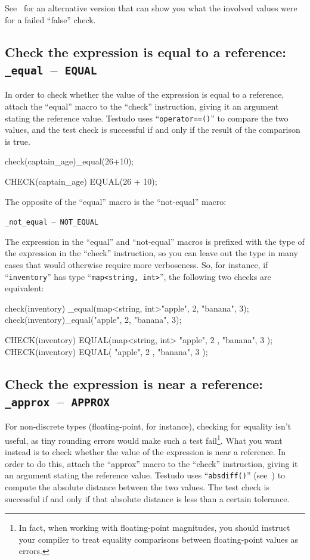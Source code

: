 \documentclass[twoside, a4paper, article]{memoir}
\newcommand*\testudocolor{\color{red!80!blue}}
\newcommand*\testudo[1]{\texttt{\testudocolor{}#1}}
\newcommand*\testudopair[2]{\testudo{#1}~--~\testudo{#2}}
\newcommand\subsectiontestudopair[3]{%
  \subsection[#1]{#1: \testudopair{#2}{#3}}}
\begin{document}
See~ for an alternative version that can
show you what the involved values were for a failed ``false'' check.

\subsectiontestudopair{Check the expression is equal to a reference}%
  {\_equal}{EQUAL}
\label{sec:check-expression-equal-reference}

In order to check whether the value of the expression is equal to a reference,
attach the ``equal'' macro to the ``check'' instruction, giving it an argument
stating the reference value.  Testudo uses ``\texttt{operator==()}'' to
compare the two values, and the test check is successful if and only if the
result of the comparison is true.

\begin{cpplisting}
check(captain_age)_equal(26+10);
\end{cpplisting}

\begin{cpplisting}
CHECK(captain_age) EQUAL(26 + 10);
\end{cpplisting}

The opposite of the ``equal'' macro is the ``not-equal'' macro:
\begin{center}
  \testudopair{\_not\_equal}{NOT\_EQUAL}
\end{center}

The expression in the ``equal'' and ``not-equal'' macros is prefixed with the
type of the expression in the ``check'' instruction, so you can leave out the
type in many cases that would otherwise require more verboseness.  So, for
instance, if ``\texttt{inventory}'' has type ``\texttt{map<string, int>}'', the
following two checks are equivalent:
\begin{cpplisting}
check(inventory)
  _equal(map<string, int>{{"apple", 2}, {"banana", 3}});
check(inventory)_equal({{"apple", 2}, {"banana", 3}});
\end{cpplisting}

\begin{cpplisting}
CHECK(inventory)
  EQUAL(map<string, int>{ { "apple", 2 }, { "banana", 3 } });
CHECK(inventory) EQUAL({ { "apple", 2 }, { "banana", 3 } });
\end{cpplisting}


\subsectiontestudopair{Check the expression is near a reference}%
  {\_approx}{APPROX}
\label{sec:check-expression-near-reference}

For non-discrete types (floating-point, for instance), checking for equality
isn't useful, as tiny rounding errors would make such a test fail\footnote{In
  fact, when working with floating-point magnitudes, you should instruct your
  compiler to treat equality comparisons between floating-point values as
  errors.}.  What you want instead is to check whether the value of the
expression is near a reference.  In order to do this, attach the ``approx''
macro to the ``check'' instruction, giving it an argument stating the reference
value.  Testudo uses ``\texttt{absdiff()}''
(see~) to compute the absolute distance
between the two values.  The test check is successful if and only if that
absolute distance is less than a certain tolerance.
\end{document}
